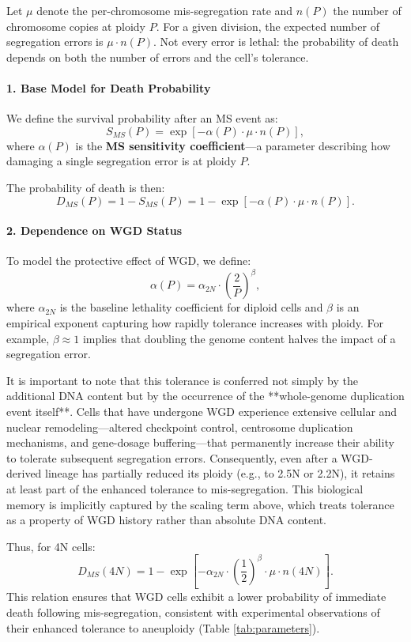 \documentclass{article}
\begin{document}
Let $\mu$ denote the per-chromosome mis-segregation rate and $n(P)$ the number of chromosome copies at ploidy $P$. For a given division, the expected number of segregation errors is $\mu \cdot n(P)$. Not every error is lethal: the probability of death depends on both the number of errors and the cell’s tolerance.

\paragraph{1. Base Model for Death Probability}
We define the survival probability after an MS event as:
\[
S_{MS}(P) = \exp[-\alpha(P) \cdot \mu \cdot n(P)],
\]
where $\alpha(P)$ is the \textbf{MS sensitivity coefficient}—a parameter describing how damaging a single segregation error is at ploidy $P$.

The probability of death is then:
\[
D_{MS}(P) = 1 - S_{MS}(P) = 1 - \exp[-\alpha(P) \cdot \mu \cdot n(P)].
\]

\paragraph{2. Dependence on WGD Status}
\color{blue} To model the protective effect of WGD, we define:
\[
\alpha(P) = \alpha_{2N} \cdot \left(\frac{2}{P}\right)^{\beta},
\]
where $\alpha_{2N}$ is the baseline lethality coefficient for diploid cells and $\beta$ is an empirical exponent capturing how rapidly tolerance increases with ploidy. \color{black} For example, $\beta \approx 1$ implies that doubling the genome content halves the impact of a segregation error.

\color{blue} It is important to note that this tolerance is conferred not simply by the additional DNA content but by the occurrence of the **whole-genome duplication event itself**. Cells that have undergone WGD experience extensive cellular and nuclear remodeling—altered checkpoint control, centrosome duplication mechanisms, and gene-dosage buffering—that permanently increase their ability to tolerate subsequent segregation errors. Consequently, even after a WGD-derived lineage has partially reduced its ploidy (e.g., to 2.5N or 2.2N), it retains at least part of the enhanced tolerance to mis-segregation. This biological memory is implicitly captured by the scaling term above, which treats tolerance as a property of WGD history rather than absolute DNA content.
\color{black}

Thus, for 4N cells:
\[
D_{MS}(4N) = 1 - \exp[-\alpha_{2N} \cdot \left(\frac{1}{2}\right)^{\beta} \cdot \mu \cdot n(4N)].
\]
This relation ensures that WGD cells exhibit a lower probability of immediate death following mis-segregation, consistent with experimental observations of their enhanced tolerance to aneuploidy (Table \ref{tab:parameters}).
\end{document}
